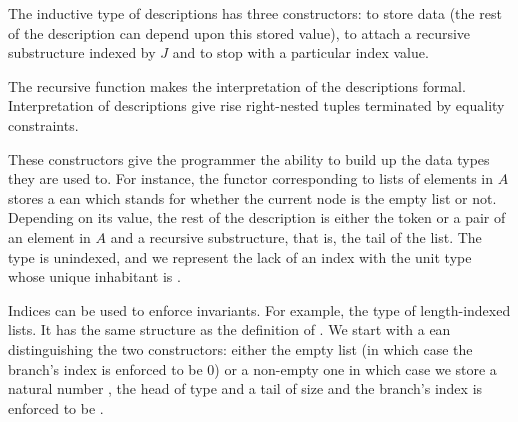 The inductive type of descriptions has three constructors:
 to store data (the rest of
the description can depend upon this stored value),  to attach a
recursive substructure indexed by $J$ and  to stop
with a particular index value.

The recursive function  makes the interpretation of the
descriptions formal. Interpretation of descriptions give rise
right-nested tuples terminated by equality constraints.

\noindent
\begin{minipage}{\textwidth}
  \begin{minipage}{0.52\textwidth}
    \noindent
  \end{minipage}
  \begin{minipage}{0.47\textwidth}
  \end{minipage}
\end{minipage}

These constructors give the programmer the ability to build up the data
types they are used to. For instance, the functor corresponding
to lists of elements in $A$ stores a ean which stands for whether
the current node is the empty list or not. Depending on its value, the
rest of the description is either the  token or a pair of an element
in $A$ and a recursive substructure, that is, the tail of the list. The  type
is unindexed, and we represent the lack of an index with the unit type \AD{$\top$}
whose unique inhabitant is .

\begin{agdasnippet}
\end{agdasnippet}

Indices can be used to enforce invariants. For example, the type {  }
of length-indexed lists. It has the same structure as the definition of .
We start with a ean distinguishing the two constructors: either
the empty list (in which case the branch's index is enforced to be $0$) or a
non-empty one in which case we store a natural number , the head of type
 and a tail of size  and the branch's index is enforced to be
 .

\begin{agdasnippet}
\end{agdasnippet}

